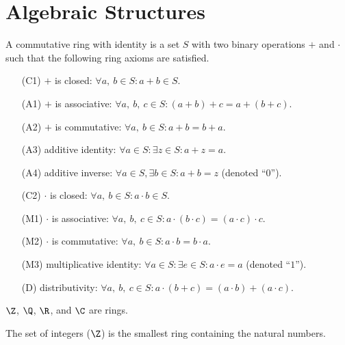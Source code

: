 \documentclass{article}
\begin{document}
\section{Algebraic Structures}
\begin{tcolorboxlarge}[title={Ring Axioms}]
    \begin{definition}
        A commutative ring with identity is a set \(S\) with two binary operations \(+\) and \(\cdot\) such that the following ring axioms are satisfied.
    \end{definition}
    \begin{enumerate}[leftmargin=3.5em, itemsep=0.2em, topsep=0.35em]
        \item[(C1)] \(+\) is closed: \(\forall a,\:b \in S: a+b \in S\).
        \item[(A1)] \(+\) is associative: \(\forall a,\:b,\:c \in S: (a+b)+c = a+(b+c)\).
        \item[(A2)] \(+\) is commutative: \(\forall a,\:b \in S: a+b=b+a\).
        \item[(A3)] additive identity: \(\forall a\in S:\exists z \in S:a+z=a\).
        \item[(A4)] additive inverse: \(\forall a \in S, \exists b\in S: a+b = z\) (denoted ``\(0\)'').
        \item[(C2)] \(\cdot\) is closed: \(\forall a,\:b \in S: a \cdot b \in S\).
        \item[(M1)] \(\cdot\) is associative: \(\forall a,\:b,\:c \in S:a \cdot (b \cdot c) = (a \cdot c) \cdot c\).
        \item[(M2)] \(\cdot\) is commutative: \(\forall a,\:b \in S:a \cdot b = b \cdot a\).
        \item[(M3)] multiplicative identity: \(\forall a \in S:\exists e \in S:a \cdot e = a\) (denoted ``\(1\)'').
        \item[(D)] distributivity: \(\forall a,\:b,\:c \in S: a \cdot (b + c) = (a \cdot b) + (a \cdot c)\).
    \end{enumerate}
\end{tcolorboxlarge}
\begin{note}
    \(\Z\), \(\Q\), \(\R\), and \(\C\) are rings.
\end{note}
%
\begin{definition}[Integers]
    The set of integers (\(\Z\)) is the smallest ring containing the natural numbers.
\end{definition}
\end{document}
